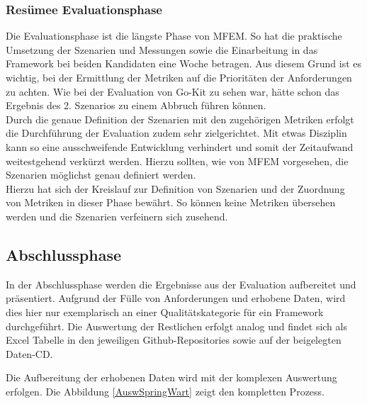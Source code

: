 \subsubsection{Resümee Evaluationsphase}

Die Evaluationsphase ist die längste Phase von \ac{MFEM}. So hat die praktische Umsetzung der Szenarien und Messungen sowie die Einarbeitung in das Framework bei beiden Kandidaten eine Woche betragen. Aus diesem Grund ist es wichtig, bei der Ermittlung der Metriken auf die Prioritäten der Anforderungen zu achten. Wie bei der Evaluation von Go-Kit zu sehen war, hätte schon das Ergebnis des 2. Szenarios zu einem Abbruch führen können.\\
Durch die genaue Definition der Szenarien mit den zugehörigen Metriken erfolgt die Durchführung der Evaluation zudem sehr zielgerichtet. Mit etwas Disziplin kann so eine ausschweifende Entwicklung verhindert und somit der Zeitaufwand weitestgehend verkürzt werden. Hierzu sollten, wie von \ac{MFEM} vorgesehen, die Szenarien möglichst genau definiert werden.\\
Hierzu hat sich der Kreislauf zur Definition von Szenarien und der Zuordnung von Metriken in dieser Phase bewährt. So können keine Metriken übersehen werden und die Szenarien verfeinern sich zusehend.    

\subsection{Abschlussphase}

In der Abschlussphase werden die Ergebnisse aus der Evaluation aufbereitet und präsentiert. Aufgrund der Fülle von Anforderungen und erhobene Daten, wird dies hier nur exemplarisch an einer Qualitätskategorie für ein Framework durchgeführt. Die Auswertung der Restlichen erfolgt analog und findet sich als Excel Tabelle in den jeweiligen Github-Repositories sowie auf der beigelegten Daten-CD.

Die Aufbereitung der erhobenen Daten wird mit der komplexen Auswertung erfolgen. Die Abbildung \ref{AuswSpringWart} zeigt den kompletten Prozess.\\


